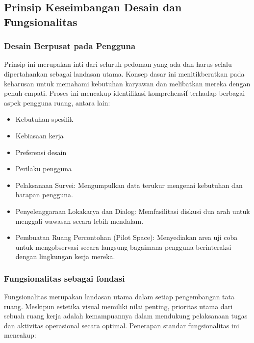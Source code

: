 \documentclass[../manperil.tex]{subfiles}
\begin{document}
\subsection{Prinsip Keseimbangan Desain dan Fungsionalitas}%
\label{sec:Prinsip Keseimbangan Desain dan Fungsionalitas}

\subsubsection{Desain Berpusat pada Pengguna}%
\label{sub:desain_berpusat_pada_pengguna}

Prinsip ini merupakan inti dari seluruh pedoman yang ada dan harus selalu dipertahankan sebagai landasan utama. Konsep dasar ini menitikberatkan pada keharusan untuk memahami kebutuhan karyawan dan melibatkan mereka dengan penuh empati. Proses ini mencakup identifikasi komprehensif terhadap berbagai aspek pengguna ruang, antara lain:

\begin{itemize}
	\item Kebutuhan spesifik
	\item Kebiasaan kerja
	\item Preferensi desain
	\item Perilaku pengguna
\end{itemize}


\begin{itemize}
	\item Pelaksanaan Survei: Mengumpulkan data terukur mengenai kebutuhan dan harapan pengguna.
	\item Penyelenggaraan Lokakarya dan Dialog: Memfasilitasi diskusi dua arah untuk menggali wawasan secara lebih mendalam.
	\item Pembuatan Ruang Percontohan (Pilot Space): Menyediakan area uji coba untuk mengobservasi secara langsung bagaimana pengguna berinteraksi dengan lingkungan kerja mereka.
\end{itemize}


\subsubsection{Fungsionalitas sebagai fondasi}%
\label{sub:fungsionalitas_sebagai_fondasi}

Fungsionalitas merupakan landasan utama dalam setiap pengembangan tata ruang. Meskipun estetika visual memiliki nilai penting, prioritas utama dari sebuah ruang kerja adalah kemampuannya dalam mendukung pelaksanaan tugas dan aktivitas operasional secara optimal. Penerapan standar fungsionalitas ini mencakup:
\end{document}
